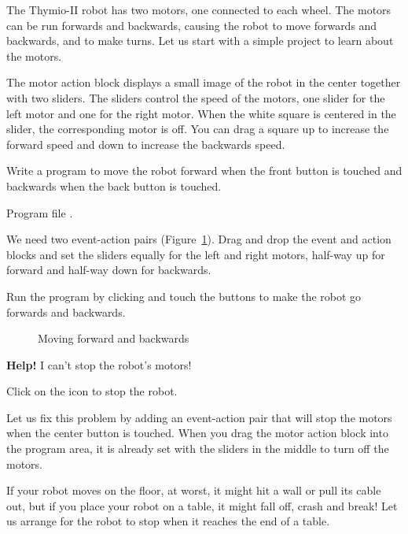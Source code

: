 

The Thymio-II robot has two motors, one connected to each wheel. The
motors can be run forwards and backwards, causing the robot to move
forwards and backwards, and to make turns. Let us start with a simple
project to learn about the motors.

The motor action block  displays a small image of the
robot in the center together with two sliders. The sliders control the
speed of the motors, one slider for the left motor and one for the right
motor. When the white square is centered in the slider, the
corresponding motor is off. You can drag a square up to increase the
forward speed and down to increase the backwards speed.

Write a program to move the robot forward when the front button
is touched and backwards when the back button is touched.

{\raggedleft \hfill Program file .}

We need two event-action pairs (Figure~\ref{fig.nostop}). Drag and drop
the event and action blocks and set the sliders equally for the left and
right motors, half-way up for forward and half-way down for backwards.

Run the program by clicking  and touch the buttons to
make the robot go forwards and backwards.

\begin{figure}
\begin{center}
\caption{Moving forward and backwards}\label{fig.nostop}
\end{center}
\end{figure}


\textbf{Help!} I can't stop the robot's motors!

Click on the icon  to stop the robot.

Let us fix this problem by adding an event-action pair 
that will stop the motors when the center button is touched. When you
drag the motor action block into the program area, it is already set
with the sliders in the middle to turn off the motors.


If your robot moves on the floor, at worst, it might hit a wall or pull
its cable out, but if you place your robot on a table, it might fall
off, crash and break! Let us arrange for the robot to stop when it
reaches the end of a table.

